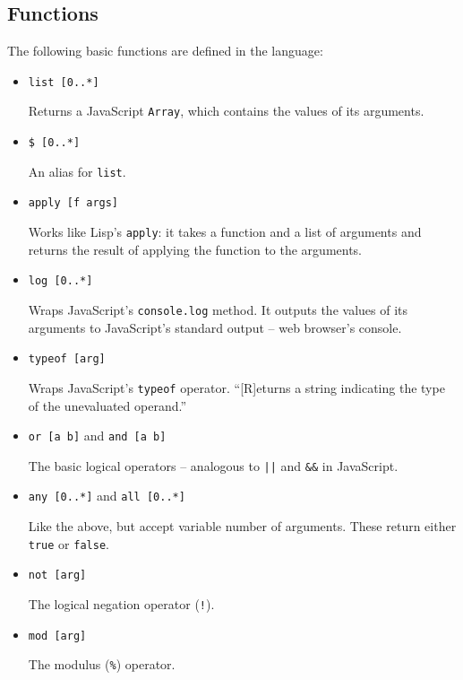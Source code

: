 \subsection{Functions}\label{sub:fun}
The following basic functions are defined in the language:
\begin{itemize}
    \item \texttt{list [0..*]}
    
    Returns a JavaScript \texttt{Array}\cite{mdn_array}, which contains the values of its arguments.
    
    \item \texttt{\$ [0..*]}
    
    An alias for \texttt{list}.
    
    \item \texttt{apply [f args]}
    
    Works like Lisp's \texttt{apply}: it takes a function and a list of arguments and returns the result of applying the function to the arguments.
    
    \item \texttt{log [0..*]}
    
    Wraps JavaScript's \texttt{console.log} method\cite{mdn_log}. It outputs the values of its arguments to JavaScript's standard output -- web browser's console.
    
    \item \texttt{typeof [arg]}
    
    Wraps JavaScript's \texttt{typeof} operator. ``[R]eturns a string indicating the type of the unevaluated operand.''\cite{mdn_typeof}
    
    \item \texttt{or [a b]} and \texttt{and [a b]}
    
    The basic logical operators -- analogous to \texttt{||} and \texttt{\&\&} in JavaScript.
    
    \item \texttt{any [0..*]} and \texttt{all [0..*]}
    
    Like the above, but accept variable number of arguments. These return either \texttt{true} or \texttt{false}.
    
    \item \texttt{not [arg]} 
    
    The logical negation operator (\texttt{!}).
        
    \item \texttt{mod [arg]}
    
    The modulus (\texttt{\%}) operator.
    

\end{itemize}
